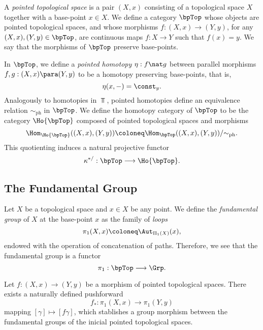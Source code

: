 \begin{definition}
\label{def:base-point-preserving-Top-cat}
A \emph{pointed topological space} is a pair \((X, x)\) consisting of a
topological space \(X\) together with a base-point \(x \in X\). We define a
category \(\bpTop\) whose objects are pointed topological spaces, and whose
morphisms \(f: (X, x) \to (Y, y)\), for any \((X, x), (Y, y) \in \bpTop\), are
continuous maps \(f: X \to Y\) such that \(f(x) = y\). We say that the morphisms
of \(\bpTop\) preserve base-points.

In \(\bpTop\), we define a \emph{pointed homotopy} \(\eta: f \nat g\) between
parallel morphisms \(f, g: (X, x) \para (Y, y)\) to be a homotopy preserving
base-points, that is,
\[
\eta(x, -) = \const_y.
\]
Analogously to homotopies in \(\Top\), pointed homotopies define an equivalence
relation \(\sim_{\text{ph}}\) in \(\bpTop\). We define the homotopy category of
\(\bpTop\) to be the category \(\Ho{\bpTop}\) composed of pointed topological
spaces and morphisms
\[
\Hom_{\Ho{\bpTop}}((X, x), (Y, y))
\coloneq \Hom_{\bpTop}((X, x), (Y, y))/{\sim_{\text{ph}}}.
\]
This quotienting induces a natural projective functor
\[
\kappa^{*/}: \bpTop \longrightarrow \Ho{\bpTop}.
\]
\end{definition}

\subsection{The Fundamental Group}

\begin{definition}
\label{def:fundamental-group}
Let \(X\) be a topological space and \(x \in X\) be any point. We define
the \emph{fundamental group} of \(X\) at the base-point \(x\) as the family of
\emph{loops}
\[
\pi_1(X, x) \coloneq \Aut_{\Pi_1(X)}(x),
\]
endowed with the operation of concatenation of paths. Therefore, we see that the
fundamental group is a functor
\[
\pi_1: \bpTop \longrightarrow \Grp.
\]
\end{definition}

\begin{definition}[Pushforwards in \(\pi_1\)]
\label{def:pushforward-pi1}
Let \(f: (X, x) \to (Y, y)\) be a morphism of pointed topological spaces. There
exists a naturally defined pushforward
\[
f_{*}: \pi_1(X, x) \longrightarrow \pi_1(Y, y)
\]
mapping \([\gamma] \mapsto [f \gamma]\), which stablishes a group morphism
between the fundamental groups of the inicial pointed topological spaces.
\end{definition}


